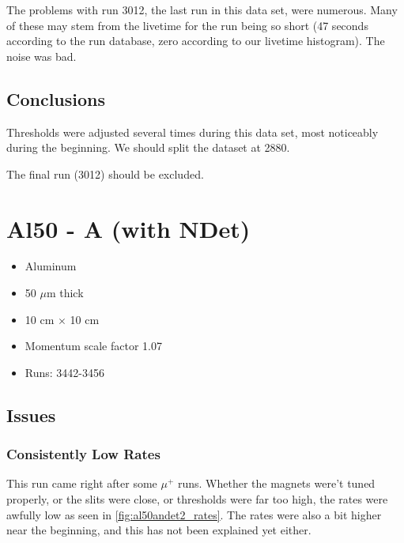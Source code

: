 \documentclass[a4paper]{article}
\begin{document}
The problems with run 3012, the last run in this data set, were numerous. Many of these may stem
from the livetime for the run being so short (47 seconds according to the run database, zero according
to our livetime histogram). The noise was bad.


\subsection{Conclusions}

Thresholds were adjusted several times during this data set, most noticeably during the beginning.
We should split the dataset at 2880.

The final run (3012) should be excluded.


\section{Al50 - A (with NDet)}
\begin{itemize}
  \item Aluminum
  \item 50 $\mu$m thick
  \item 10 cm $\times$ 10 cm
  \item Momentum scale factor 1.07
  \item Runs: 3442-3456
\end{itemize}

\subsection{Issues}
\subsubsection{Consistently Low Rates}
\label{sec:al50andet2_rates}

This run came right after some $\mu^+$ runs. Whether the magnets were't tuned properly, or the slits were close, or thresholds were far too
high, the rates were awfully low as seen in \ref{fig:al50andet2_rates}. The rates were also a bit higher near the beginning, and
this has not been explained yet either.
\end{document}

